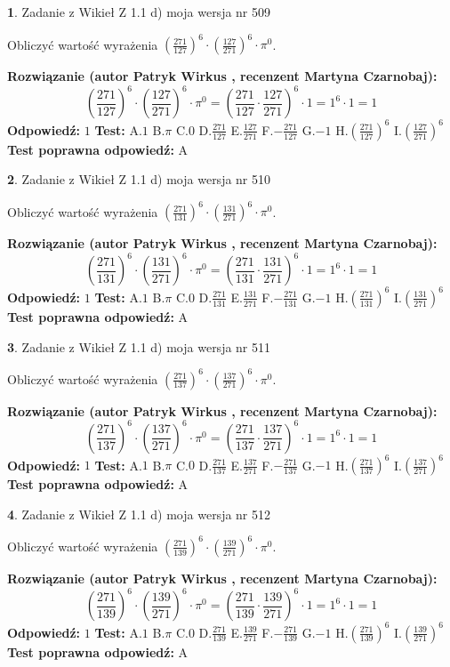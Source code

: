 \documentclass[12pt, a4paper]{article}
\theoremstyle{definition} %
\newtheorem{zad}{}
\newcommand{\zadStart}[1]{\begin{zad}#1\newline}
\newcommand{\zadStop}{\end{zad}}
\newcommand{\rozwStart}[2]{\noindent \textbf{Rozwiązanie (autor #1 , recenzent #2): }\newline}
\newcommand{\rozwStop}{\newline}
\newcommand{\odpStart}{\noindent \textbf{Odpowiedź:}\newline}
\newcommand{\odpStop}{\newline}
\newcommand{\testStart}{\noindent \textbf{Test:}\newline}
\newcommand{\testStop}{\newline}
\newcommand{\kluczStart}{\noindent \textbf{Test poprawna odpowiedź:}\newline}
\newcommand{\kluczStop}{\newline}
\begin{document}
\zadStart{Zadanie z Wikieł Z 1.1 d) moja wersja nr 509}

Obliczyć wartość wyrażenia $(\frac{271}{127})^{6} \cdot (\frac{127}{271})^{6} \cdot \pi^{0}$.
\zadStop
\rozwStart{Patryk Wirkus}{Martyna Czarnobaj}
$$(\frac{271}{127})^{6} \cdot (\frac{127}{271})^{6} \cdot \pi^{0} = (\frac{271}{127} \cdot \frac{127}{271})^{6} \cdot 1 = 1^{6} \cdot 1 = 1$$
\rozwStop
\odpStart
$1$
\odpStop
\testStart
A.$1$ B.$\pi$ C.$0$ D.$\frac{271}{127}$ E.$\frac{127}{271}$
F.$-\frac{271}{127}$ G.$-1$
H.$(\frac{271}{127})^{6}$
I.$(\frac{127}{271})^{6}$
\testStop
\kluczStart
A
\kluczStop



\zadStart{Zadanie z Wikieł Z 1.1 d) moja wersja nr 510}

Obliczyć wartość wyrażenia $(\frac{271}{131})^{6} \cdot (\frac{131}{271})^{6} \cdot \pi^{0}$.
\zadStop
\rozwStart{Patryk Wirkus}{Martyna Czarnobaj}
$$(\frac{271}{131})^{6} \cdot (\frac{131}{271})^{6} \cdot \pi^{0} = (\frac{271}{131} \cdot \frac{131}{271})^{6} \cdot 1 = 1^{6} \cdot 1 = 1$$
\rozwStop
\odpStart
$1$
\odpStop
\testStart
A.$1$ B.$\pi$ C.$0$ D.$\frac{271}{131}$ E.$\frac{131}{271}$
F.$-\frac{271}{131}$ G.$-1$
H.$(\frac{271}{131})^{6}$
I.$(\frac{131}{271})^{6}$
\testStop
\kluczStart
A
\kluczStop



\zadStart{Zadanie z Wikieł Z 1.1 d) moja wersja nr 511}

Obliczyć wartość wyrażenia $(\frac{271}{137})^{6} \cdot (\frac{137}{271})^{6} \cdot \pi^{0}$.
\zadStop
\rozwStart{Patryk Wirkus}{Martyna Czarnobaj}
$$(\frac{271}{137})^{6} \cdot (\frac{137}{271})^{6} \cdot \pi^{0} = (\frac{271}{137} \cdot \frac{137}{271})^{6} \cdot 1 = 1^{6} \cdot 1 = 1$$
\rozwStop
\odpStart
$1$
\odpStop
\testStart
A.$1$ B.$\pi$ C.$0$ D.$\frac{271}{137}$ E.$\frac{137}{271}$
F.$-\frac{271}{137}$ G.$-1$
H.$(\frac{271}{137})^{6}$
I.$(\frac{137}{271})^{6}$
\testStop
\kluczStart
A
\kluczStop



\zadStart{Zadanie z Wikieł Z 1.1 d) moja wersja nr 512}

Obliczyć wartość wyrażenia $(\frac{271}{139})^{6} \cdot (\frac{139}{271})^{6} \cdot \pi^{0}$.
\zadStop
\rozwStart{Patryk Wirkus}{Martyna Czarnobaj}
$$(\frac{271}{139})^{6} \cdot (\frac{139}{271})^{6} \cdot \pi^{0} = (\frac{271}{139} \cdot \frac{139}{271})^{6} \cdot 1 = 1^{6} \cdot 1 = 1$$
\rozwStop
\odpStart
$1$
\odpStop
\testStart
A.$1$ B.$\pi$ C.$0$ D.$\frac{271}{139}$ E.$\frac{139}{271}$
F.$-\frac{271}{139}$ G.$-1$
H.$(\frac{271}{139})^{6}$
I.$(\frac{139}{271})^{6}$
\testStop
\kluczStart
A
\kluczStop
\end{document}

